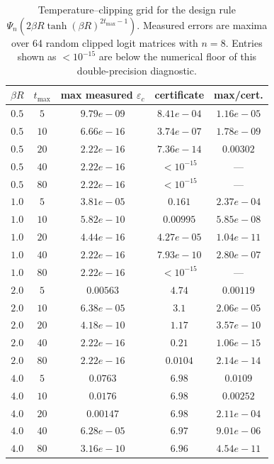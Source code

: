 \begin{table}[t]
\centering
\scriptsize
\begin{tabular}{ccccc}
\toprule
$\beta R$ & $t_{\max}$ & max measured $\varepsilon_c$ & certificate & max/cert. \\
\midrule
$0.5$ & $5$ & $9.79e-09$ & $8.41e-04$ & $1.16e-05$ \\
$0.5$ & $10$ & $6.66e-16$ & $3.74e-07$ & $1.78e-09$ \\
$0.5$ & $20$ & $2.22e-16$ & $7.36e-14$ & $0.00302$ \\
$0.5$ & $40$ & $2.22e-16$ & $<10^{-15}$ & --- \\
$0.5$ & $80$ & $2.22e-16$ & $<10^{-15}$ & --- \\
$1.0$ & $5$ & $3.81e-05$ & $0.161$ & $2.37e-04$ \\
$1.0$ & $10$ & $5.82e-10$ & $0.00995$ & $5.85e-08$ \\
$1.0$ & $20$ & $4.44e-16$ & $4.27e-05$ & $1.04e-11$ \\
$1.0$ & $40$ & $2.22e-16$ & $7.93e-10$ & $2.80e-07$ \\
$1.0$ & $80$ & $2.22e-16$ & $<10^{-15}$ & --- \\
$2.0$ & $5$ & $0.00563$ & $4.74$ & $0.00119$ \\
$2.0$ & $10$ & $6.38e-05$ & $3.1$ & $2.06e-05$ \\
$2.0$ & $20$ & $4.18e-10$ & $1.17$ & $3.57e-10$ \\
$2.0$ & $40$ & $2.22e-16$ & $0.21$ & $1.06e-15$ \\
$2.0$ & $80$ & $2.22e-16$ & $0.0104$ & $2.14e-14$ \\
$4.0$ & $5$ & $0.0763$ & $6.98$ & $0.0109$ \\
$4.0$ & $10$ & $0.0176$ & $6.98$ & $0.00252$ \\
$4.0$ & $20$ & $0.00147$ & $6.98$ & $2.11e-04$ \\
$4.0$ & $40$ & $6.28e-05$ & $6.97$ & $9.01e-06$ \\
$4.0$ & $80$ & $3.16e-10$ & $6.96$ & $4.54e-11$ \\
\bottomrule
\end{tabular}
\caption{Temperature--clipping grid for the design rule $\Psi_n(2\beta R\tanh(\beta R)^{2t_{\max}-1})$. Measured errors are maxima over 64 random clipped logit matrices with $n=8$. Entries shown as $<10^{-15}$ are below the numerical floor of this double-precision diagnostic.}
\label{tab:temperature_clipping_grid}
\end{table}
